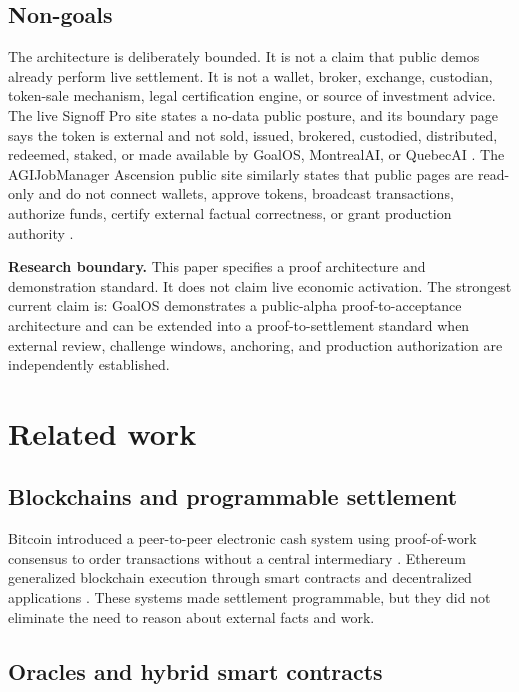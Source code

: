 \subsection{Non-goals}

The architecture is deliberately bounded. It is not a claim that public demos already perform live settlement. It is not a wallet, broker, exchange, custodian, token-sale mechanism, legal certification engine, or source of investment advice. The live Signoff Pro site states a no-data public posture, and its \AGIALPHA{} boundary page says the token is external and not sold, issued, brokered, custodied, distributed, redeemed, staked, or made available by GoalOS, MontrealAI, or QuebecAI \citep{goalosNoData,goalosAgialpha}. The AGIJobManager Ascension public site similarly states that public pages are read-only and do not connect wallets, approve tokens, broadcast transactions, authorize funds, certify external factual correctness, or grant production authority \citep{goalosAgijobmanager}.

\begin{boundarybox}
\textbf{Research boundary.} This paper specifies a proof architecture and demonstration standard. It does not claim live economic activation. The strongest current claim is: GoalOS demonstrates a public-alpha proof-to-acceptance architecture and can be extended into a proof-to-settlement standard when external review, challenge windows, anchoring, and production authorization are independently established.
\end{boundarybox}

\section{Related work}

\subsection{Blockchains and programmable settlement}

Bitcoin introduced a peer-to-peer electronic cash system using proof-of-work consensus to order transactions without a central intermediary \citep{nakamoto2008bitcoin}. Ethereum generalized blockchain execution through smart contracts and decentralized applications \citep{buterin2014ethereum}. These systems made settlement programmable, but they did not eliminate the need to reason about external facts and work.

\subsection{Oracles and hybrid smart contracts}

